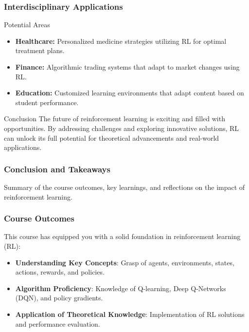 \documentclass{beamer}
\begin{document}
\begin{frame}[fragile]
    \frametitle{Interdisciplinary Applications}
    \begin{block}{Potential Areas}
        \begin{itemize}
            \item \textbf{Healthcare:} Personalized medicine strategies utilizing RL for optimal treatment plans.
            \item \textbf{Finance:} Algorithmic trading systems that adapt to market changes using RL.
            \item \textbf{Education:} Customized learning environments that adapt content based on student performance.
        \end{itemize}
    \end{block}
    \begin{block}{Conclusion}
        The future of reinforcement learning is exciting and filled with opportunities. By addressing challenges and exploring innovative solutions, RL can unlock its full potential for theoretical advancements and real-world applications.
    \end{block}
\end{frame}

\begin{frame}[fragile]
    \frametitle{Conclusion and Takeaways}
    Summary of the course outcomes, key learnings, and reflections on the impact of reinforcement learning.
\end{frame}

\begin{frame}[fragile]
    \frametitle{Course Outcomes}
    This course has equipped you with a solid foundation in reinforcement learning (RL):

    \begin{itemize}
        \item \textbf{Understanding Key Concepts}: Grasp of agents, environments, states, actions, rewards, and policies.
        \item \textbf{Algorithm Proficiency}: Knowledge of Q-learning, Deep Q-Networks (DQN), and policy gradients.
        \item \textbf{Application of Theoretical Knowledge}: Implementation of RL solutions and performance evaluation.
    \end{itemize}
\end{frame}
\end{document}
